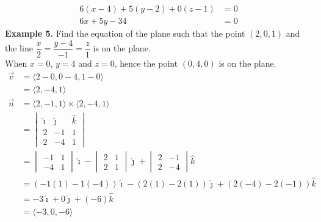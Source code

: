 \documentclass{report}
\begin{document}
\vspace{-3.5em}
\begin{align*}
    6(x - 4) + 5(y - 2) + 0(z - 1) & = 0 \\
    6x + 5y - 34                   & = 0
\end{align*}
\noindent\textbf{Example 5. } Find the equation of the plane such that the point $(2, 0, 1)$ and the line $\dfrac{x}{2} = \dfrac{y-4}{-1} = \dfrac{z}{1}$ is on the plane.
~\\
When $x = 0$, $y = 4$ and $z = 0$, hence the point $(0, 4, 0)$ is on the plane.
\begin{align*}
    \vec{v} & = \langle 2 - 0, 0 - 4, 1 - 0 \rangle                                              \\
            & = \langle 2, -4, 1 \rangle                                                         \\
    \vec{n} & = \langle 2, -1, 1 \rangle \times \langle 2, -4, 1 \rangle                         \\
            & = \begin{vmatrix}
                    \hat{\imath} & \hat{\jmath} & \hat{k} \\
                    2            & -1           & 1       \\
                    2            & -4           & 1
                \end{vmatrix}                       \\
            & = \begin{vmatrix}
                    -1 & 1 \\
                    -4 & 1
                \end{vmatrix}\hat{\imath} - \begin{vmatrix}
                                                2 & 1 \\
                                                2 & 1
                                            \end{vmatrix}\hat{\jmath} + \begin{vmatrix}
                                                                            2 & -1 \\
                                                                            2 & -4
                                                                        \end{vmatrix}\hat{k}     \\
            & = (-1(1) - 1(-4))\hat{\imath} - (2(1) - 2(1))\hat{\jmath} + (2(-4) - 2(-1))\hat{k} \\
            & = -3\hat{\imath} + 0\hat{\jmath} + (-6)\hat{k}                                     \\
            & = \langle -3, 0, -6 \rangle
\end{align*}
\end{document}
